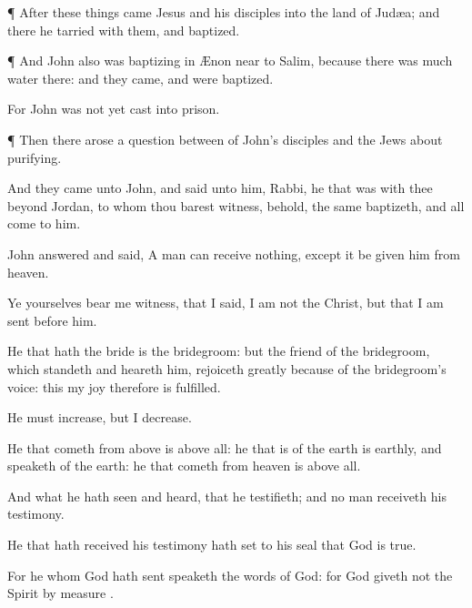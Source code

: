 {




\par }{\PP {}¶
After these
things
came
Jesus
and
his
disciples
into the
land of
Judæa;
and
there he
tarried
with
them,
and
baptized.


\par }{\PP {}¶
And
John
also
was
baptizing
in
Ænon
near to
Salim,
because there
was
much
water
there:
and they
came,
and were
baptized.

For
John
was not
yet
cast
into
prison.


\par }{\PP {}¶
Then there
arose a
question
between
{}
of
John’s
disciples
and the
Jews
about
purifying.

And they
came
unto
John,
and
said unto
him,
Rabbi,
he that
was
with
thee
beyond
Jordan, to
whom
thou barest
witness,
behold, the
same
baptizeth,
and
all
{}
come
to
him.

John
answered
and
said, A
man
can
receive
nothing,
except it
be
given
him
from
heaven.

Ye
yourselves
bear
me
witness,
that I
said,
I
am
not the
Christ,
but
that I
am
sent
before
him.

He that
hath the
bride
is the
bridegroom:
but the
friend of the
bridegroom, which
standeth
and
heareth
him,
rejoiceth
greatly
because of
the
bridegroom’s
voice:
this
my
joy
therefore is
fulfilled.

He
must
increase,
but
I
{}
decrease.

He that
cometh from
above
is
above
all: he that
is
of the
earth
is
earthly,
and
speaketh
of the
earth: he that
cometh
from
heaven
is
above
all.

And
what he hath
seen
and
heard,
that he
testifieth;
and no
man
receiveth
his
testimony.

He that hath
received
his
testimony hath set to his
seal
that
God
is
true.

For he
whom
God hath
sent
speaketh the
words of
God:
for
God
giveth
not the
Spirit
by
measure
{}.

}
